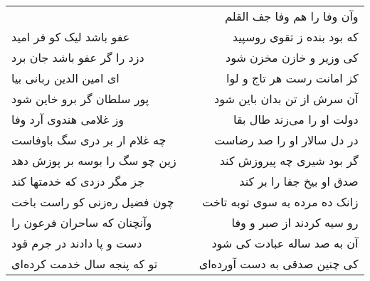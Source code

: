 \begin{center}
\begin{longtable}{l p{0.5cm} r}
&&
وآن وفا را هم وفا جف القلم
\\
عفو باشد لیک کو فر امید
&&
که بود بنده ز تقوی روسپید
\\
دزد را گر عفو باشد جان برد
&&
کی وزیر و خازن مخزن شود
\\
ای امین الدین ربانی بیا
&&
کز امانت رست هر تاج و لوا
\\
پور سلطان گر برو خاین شود
&&
آن سرش از تن بدان باین شود
\\
وز غلامی هندوی آرد وفا
&&
دولت او را می‌زند طال بقا
\\
چه غلام ار بر دری سگ باوفاست
&&
در دل سالار او را صد رضاست
\\
زین چو سگ را بوسه بر پوزش دهد
&&
گر بود شیری چه پیروزش کند
\\
جز مگر دزدی که خدمتها کند
&&
صدق او بیخ جفا را بر کند
\\
چون فضیل ره‌زنی کو راست باخت
&&
زانک ده مرده به سوی توبه تاخت
\\
وآنچنان که ساحران فرعون را
&&
رو سیه کردند از صبر و وفا
\\
دست و پا دادند در جرم قود
&&
آن به صد ساله عبادت کی شود
\\
تو که پنجه سال خدمت کرده‌ای
&&
کی چنین صدقی به دست آورده‌ای
\\
\end{longtable}
\end{center}
